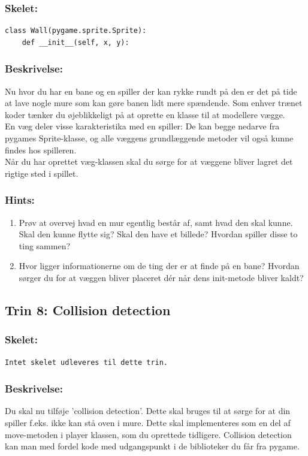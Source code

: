 \documentclass[10pt,a4paper,danish]{article}
\begin{document}
\subsubsection{Skelet:} 
\begin{verbatim}
class Wall(pygame.sprite.Sprite):
    def __init__(self, x, y):
\end{verbatim}

\subsubsection{Beskrivelse:}
Nu hvor du har en bane og en spiller der kan rykke
rundt på den er det på tide at lave nogle mure som 
kan gøre banen lidt mere spændende. Som enhver trænet
koder tænker du øjeblikkeligt på at oprette en klasse
til at modellere vægge. 
\\
En væg deler visse karakteristika med en spiller:
De kan begge nedarve fra pygames Sprite-klasse, og 
alle væggens grundlæggende metoder vil også kunne
findes hos spilleren. 
\\
Når du har oprettet væg-klassen skal du sørge
for at væggene bliver lagret det rigtige sted
i spillet. 

\subsubsection{Hints:}
\begin{enumerate} 
\item Prøv at overvej hvad en mur egentlig består af,
   samt hvad den skal kunne. Skal den kunne flytte sig?
   Skal den have et billede? Hvordan spiller disse 
   to ting sammen?
\item Hvor ligger informationerne om de ting der er 
   at finde på en bane? Hvordan sørger du for at
   væggen bliver placeret dér når dens init-metode
   bliver kaldt?
\end{enumerate}

\subsection{Trin 8: Collision detection }
\subsubsection{Skelet:} 
\begin{verbatim}
Intet skelet udleveres til dette trin. 
\end{verbatim}
\subsubsection{Beskrivelse:}
Du skal nu tilføje 'collision detection'. Dette skal bruges
til at sørge for at din spiller f.eks. ikke kan stå oven i 
mure. Dette skal implementeres som en del af move-metoden i 
player klassen, som du oprettede tidligere.
Collision detection kan man med fordel kode med udgangspunkt
i de biblioteker du får fra pygame.
\end{document}
